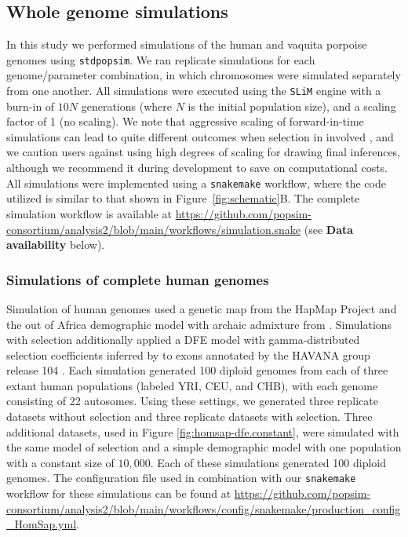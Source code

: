 \documentclass[hidelinks]{article}
\newcommand{\stdpopsim}{\texttt{stdpopsim}\xspace}
\newcommand{\slim}{\texttt{SLiM}\xspace}
\newcommand{\snakemake}{\texttt{snakemake}\xspace}
\begin{document}
    \subsection*{Whole genome simulations}
    In this study we performed simulations of the human and vaquita porpoise genomes
    using \stdpopsim{}. We ran replicate simulations for each genome/parameter combination,
    in which chromosomes were simulated separately from one another.
    All simulations were executed using the \slim engine with a burn-in of $10N$ generations
    (where $N$ is the initial population size), and a scaling factor of 1 (no scaling).
    We note that aggressive scaling of forward-in-time simulations
    can lead to quite different outcomes when selection in involved
    \cite{uricchio2014robust,ferrari2024towards, dabi2025population},
    and we caution users against using high degrees of scaling for drawing
    final inferences, although we recommend it during development to save
    on computational costs. 
    All simulations were implemented using a \snakemake workflow,
    where the code utilized is similar to that shown in Figure~\ref{fig:schematic}B.
    The complete simulation workflow is available at \url{https://github.com/popsim-consortium/analysis2/blob/main/workflows/simulation.snake}
    (see \textbf{Data availability} below).


    \subsubsection*{Simulations of complete human genomes}
    Simulation of human genomes used a genetic map from the HapMap Project
    \citep[\stdpopsim label \texttt{HapMapII\_GRCh38}]{international2007second} and
    the out of Africa demographic model with archaic admixture from
    \citet[\stdpopsim label \texttt{OutOfAfricaArchaicAdmixture\_5R19}]{ragsdale2019models}.
    Simulations with selection additionally applied a DFE model with gamma-distributed selection coefficients inferred by
    \citet[\stdpopsim label \texttt{Gamma\_K17}]{kim2017inference} to exons annotated by the HAVANA group release 104
    \citep[\stdpopsim label \texttt{ensembl\_havana\_104\_exons}]{ensembl2018}.
    Each simulation generated 100 diploid genomes from each of three extant human populations (labeled YRI, CEU, and CHB),
    with each genome consisting of 22 autosomes.
    Using these settings, we generated three replicate datasets without selection
    and three replicate datasets with selection.
    Three additional datasets, used in Figure \ref{fig:homsap-dfe.constant},
    were simulated with the same model of selection and a simple demographic model with one population with a constant size of $10,000$.
    Each of these simulations generated 100 diploid genomes.
    The configuration file used in combination with our \snakemake workflow
    for these simulations can be found at \url{https://github.com/popsim-consortium/analysis2/blob/main/workflows/config/snakemake/production_config_HomSap.yml}.
\end{document}
